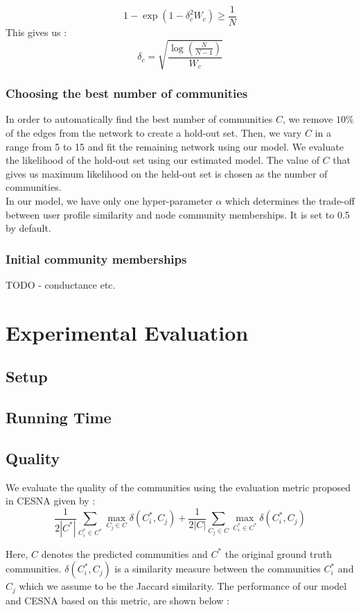 \documentclass[11pt]{article}
\begin{document}
\[ 1 - \exp(1 - \delta_c^2 W_c) \geq \frac{1}{N} \]
This gives us :
$$\delta_c = \sqrt{\frac{\log(\frac{N}{N-1})}{W_c}}$$

\subsubsection*{Choosing the best number of communities}
In order to automatically find the best number of communities $C$, we remove $10 \%$ of the edges from the network to create a hold-out set. Then, we vary $C$ in a range from 5 to 15 and fit the remaining network using our model.  We evaluate the likelihood of the hold-out set using our estimated model. The value of $C$ that gives us maximum likelihood on the held-out set is chosen as the number of communities. \\[5pt]
In our model, we have only one hyper-parameter $\alpha$ which determines the trade-off between user profile similarity and node community memberships. It is set to 0.5 by default. 

\subsubsection*{Initial community memberships}
TODO - conductance etc.

\section{Experimental Evaluation}
\subsection{Setup}
\subsection{Running Time}
\subsection{Quality}
We evaluate the quality of the communities using the evaluation metric proposed in CESNA given by : 
\[ \frac{1}{2 |C^{*}|} \sum\limits_{C_i^{*} \in C^{*}} \max_{C_j \in C} \delta (C_i^{*}, C_j) + \frac{1}{2 |C|} \sum\limits_{C_j \in C} \max_{C_i^{*} \in C^{*}} \delta (C_i^{*}, C_j) \]

Here, $C$ denotes the  predicted communities and $C^{*}$ the original ground truth communities. $\delta(C_i^{*}, C_j)$ is a similarity measure between the communities $C_i^{*}$ and $C_j$ which we assume to be the Jaccard similarity. The performance of our model and CESNA based on this metric, are shown below :
\end{document}
